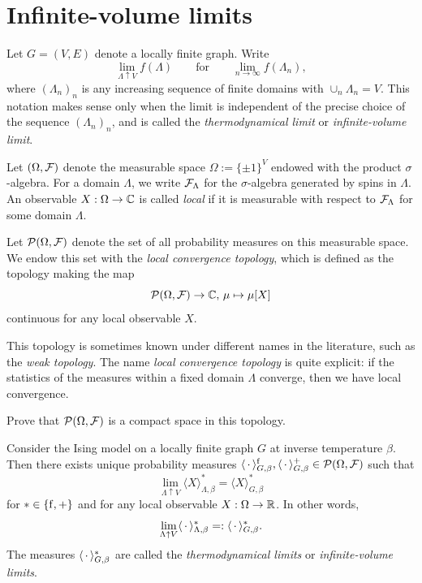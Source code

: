 \section{Infinite-volume limits}
\label{sec:vanishing_magnetisation}

\begin{definition}
    Let $G=(V,E)$ denote a locally finite graph.
    Write
    \[
        \lim_{\Lambda\uparrow V}f(\Lambda)
        \qquad\text{for}\qquad
        \lim_{n\to\infty}f(\Lambda_n),
    \]
    where $(\Lambda_n)_n$ is any increasing sequence of finite domains
    with $\cup_n\Lambda_n=V$.
    This notation makes sense only when the limit is independent
    of the precise choice of the sequence $(\Lambda_n)_n$,
    and is called the \emph{thermodynamical limit} or \emph{infinite-volume limit}.

    Let $(\Omega,\mathcal F)$ denote the measurable space $\Omega:=\{\pm1\}^V$
    endowed with the product $\sigma$-algebra.
    For a domain $\Lambda$, we write $\mathcal F_\Lambda$
    for the $\sigma$-algebra generated by spins in $\Lambda$.
    An observable $X:\Omega\to\mathbb C$ is called \emph{local} if it is measurable
    with respect to $\mathcal F_\Lambda$ for some domain $\Lambda$.

    Let $\mathcal P(\Omega,\mathcal F)$ denote the set of all probability measures
    on this measurable space.
    We endow this set with the \emph{local convergence topology},
    which is defined as the topology making the map
    \[
        \mathcal P(\Omega,\mathcal F)\to\mathbb C,\,\mu\mapsto\mu[X]
    \]
    continuous for any local observable $X$.
\end{definition}

\begin{remark*}
    This topology is sometimes known under different names in the literature,
    such as the \emph{weak topology}.
    The name \emph{local convergence topology} is quite explicit:
    if the statistics of the measures within a fixed domain $\Lambda$ converge,
    then we have local convergence.
\end{remark*}

\begin{exercise}
    Prove that $\mathcal P(\Omega,\mathcal F)$ is a compact space in this topology.
\end{exercise}

\begin{theorem}
    Consider the Ising model on a locally finite graph $G$
    at inverse temperature $\beta$.
    Then there exists unique probability measures
    $\langle\,\cdot\,\rangle_{G,\beta}^{\operatorname{f}},\langle\,\cdot\,\rangle^+_{G,\beta}\in\mathcal P(\Omega,\mathcal F)$
    such that
    \[
        \lim_{\Lambda\uparrow V}\langle X\rangle_{\Lambda,\beta}^*=\langle X\rangle_{G,\beta}^*
    \]
    for $*\in\{{\operatorname{f}},+\}$ and
    for any local observable $X:\Omega\to\mathbb R$.
    In other words,
    \[
        \lim_{\Lambda\uparrow V}\langle \,\cdot\,\rangle_{\Lambda,\beta}^*
        =:
        \langle \,\cdot\,\rangle_{G,\beta}^*.
    \]
    The measures $\langle\,\cdot\,\rangle_{G,\beta}^*$ are called
    the \emph{thermodynamical limits} or \emph{infinite-volume limits}.
\end{theorem}


